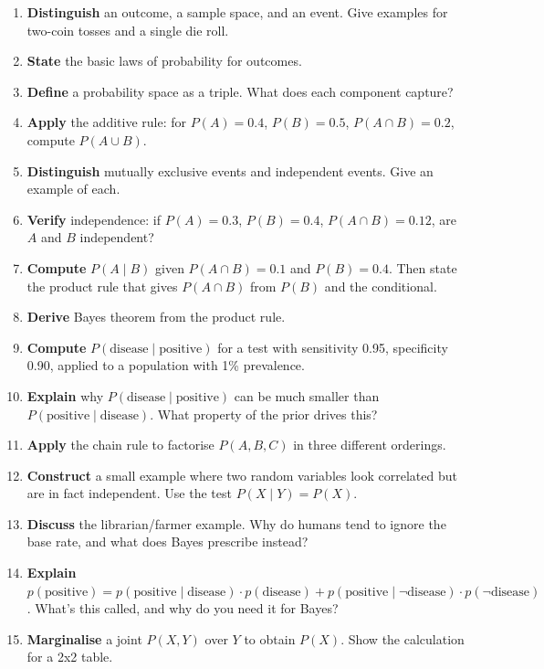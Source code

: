 \documentclass[11pt, a4paper]{article}
\begin{document}
\begin{enumerate}
  \item \textbf{Distinguish} an outcome, a sample space, and an event. Give examples for two-coin tosses and a single die roll.
  \item \textbf{State} the basic laws of probability for outcomes.
  \item \textbf{Define} a probability space as a triple. What does each component capture?
  \item \textbf{Apply} the additive rule: for $P(A) = 0.4$, $P(B) = 0.5$, $P(A \cap B) = 0.2$, compute $P(A \cup B)$.
  \item \textbf{Distinguish} mutually exclusive events and independent events. Give an example of each.
  \item \textbf{Verify} independence: if $P(A) = 0.3$, $P(B) = 0.4$, $P(A \cap B) = 0.12$, are $A$ and $B$ independent?
  \item \textbf{Compute} $P(A \mid B)$ given $P(A \cap B) = 0.1$ and $P(B) = 0.4$. Then state the product rule that gives $P(A \cap B)$ from $P(B)$ and the conditional.
  \item \textbf{Derive} Bayes theorem from the product rule.
  \item \textbf{Compute} $P(\text{disease} \mid \text{positive})$ for a test with sensitivity 0.95, specificity 0.90, applied to a population with 1\% prevalence.
  \item \textbf{Explain} why $P(\text{disease} \mid \text{positive})$ can be much smaller than $P(\text{positive} \mid \text{disease})$. What property of the prior drives this?
  \item \textbf{Apply} the chain rule to factorise $P(A, B, C)$ in three different orderings.
  \item \textbf{Construct} a small example where two random variables look correlated but are in fact independent. Use the test $P(X \mid Y) = P(X)$.
  \item \textbf{Discuss} the librarian/farmer example. Why do humans tend to ignore the base rate, and what does Bayes prescribe instead?
  \item \textbf{Explain} $p(\text{positive}) = p(\text{positive} \mid \text{disease}) \cdot p(\text{disease}) + p(\text{positive} \mid \neg\text{disease}) \cdot p(\neg\text{disease})$. What's this called, and why do you need it for Bayes?
  \item \textbf{Marginalise} a joint $P(X, Y)$ over $Y$ to obtain $P(X)$. Show the calculation for a 2x2 table.
\end{enumerate}
\end{document}

